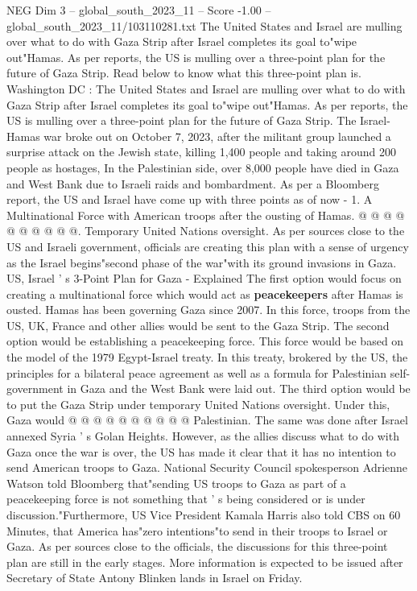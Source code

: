\begin{textsample}{NEG Dim 3 – global\_south\_2023\_11 – Score -1.00 – global\_south\_2023\_11/103110281.txt}  \label{ex:f3_neg_081}
The United States and Israel are mulling over what to do with Gaza Strip after Israel completes its goal to"wipe out"Hamas.
As per reports, the US is mulling over a three-point plan for the future of Gaza Strip.
Read below to know what this three-point plan is.
Washington DC : The United States and Israel are mulling over what to do with Gaza Strip after Israel completes its goal to"wipe out"Hamas.
As per reports, the US is mulling over a three-point plan for the future of Gaza Strip.
The Israel-Hamas war broke out on October 7, 2023, after the militant group launched a surprise attack on the Jewish state, killing 1,400 people and taking around 200 people as hostages, In the Palestinian side, over 8,000 people have died in Gaza and West Bank due to Israeli raids and bombardment.
As per a Bloomberg report, the US and Israel have come up with three points as of now - 1.
A Multinational Force with American troops after the ousting of Hamas. @ @ @ @ @ @ @ @ @ @.
Temporary United Nations oversight.
As per sources close to the US and Israeli government, officials are creating this plan with a sense of urgency as the Israel begins"second phase of the war"with its ground invasions in Gaza.
US, Israel ' s 3-Point Plan for Gaza - Explained The first option would focus on creating a multinational force which would act as \textbf{peacekeepers} after Hamas is ousted.
Hamas has been governing Gaza since 2007.
In this force, troops from the US, UK, France and other allies would be sent to the Gaza Strip.
The second option would be establishing a peacekeeping force.
This force would be based on the model of the 1979 Egypt-Israel treaty.
In this treaty, brokered by the US, the principles for a bilateral peace agreement as well as a formula for Palestinian self-government in Gaza and the West Bank were laid out.
The third option would be to put the Gaza Strip under temporary United Nations oversight.
Under this, Gaza would @ @ @ @ @ @ @ @ @ @ Palestinian.
The same was done after Israel annexed Syria ' s Golan Heights.
However, as the allies discuss what to do with Gaza once the war is over, the US has made it clear that it has no intention to send American troops to Gaza.
National Security Council spokesperson Adrienne Watson told Bloomberg that"sending US troops to Gaza as part of a peacekeeping force is not something that ' s being considered or is under discussion."Furthermore, US Vice President Kamala Harris also told CBS on 60 Minutes, that America has"zero intentions"to send in their troops to Israel or Gaza.
As per sources close to the officials, the discussions for this three-point plan are still in the early stages.
More information is expected to be issued after Secretary of State Antony Blinken lands in Israel on Friday.

\end{textsample}
